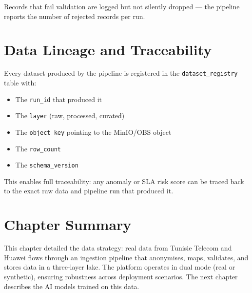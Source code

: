 Records that fail validation are logged but not silently dropped --- the pipeline reports the number of rejected records per run.

\section{Data Lineage and Traceability}

Every dataset produced by the pipeline is registered in the \texttt{dataset\_registry} table with:
\begin{itemize}
  \item The \texttt{run\_id} that produced it
  \item The \texttt{layer} (raw, processed, curated)
  \item The \texttt{object\_key} pointing to the MinIO/OBS object
  \item The \texttt{row\_count}
  \item The \texttt{schema\_version}
\end{itemize}

This enables full traceability: any anomaly or SLA risk score can be traced back to the exact raw data and pipeline run that produced it.

\section{Chapter Summary}

This chapter detailed the data strategy: real data from Tunisie Telecom and Huawei flows through an ingestion pipeline that anonymises, maps, validates, and stores data in a three-layer lake. The platform operates in dual mode (real or synthetic), ensuring robustness across deployment scenarios. The next chapter describes the AI models trained on this data.
